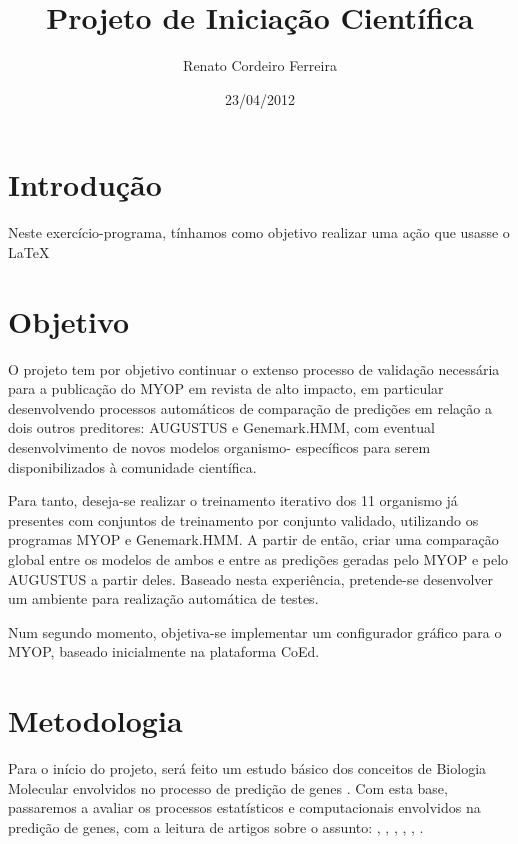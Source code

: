 \documentclass[a4paper,12pt]{article}
\title{Projeto de Iniciação Científica}
\author{Renato Cordeiro Ferreira}
\date{23/04/2012}
\begin{document}
\newpage %

\section{Introdução} %

    Neste exercício-programa, tínhamos como objetivo realizar uma ação
    que usasse o \LaTeX

\section{Objetivo} %

  O projeto tem por objetivo continuar o extenso processo de validação necessária
  para a publicação do MYOP em revista de alto impacto, em particular desenvolvendo
  processos automáticos de comparação de predições em relação a dois outros preditores:
  AUGUSTUS e Genemark.HMM, com eventual desenvolvimento de novos modelos organismo-
  específicos para serem disponibilizados à comunidade científica.
  
  Para tanto, deseja-se realizar o treinamento iterativo dos 11 organismo já presentes
  com conjuntos de treinamento por conjunto validado, utilizando os programas MYOP e
  Genemark.HMM. A partir de então, criar uma comparação global entre os modelos de ambos
  e entre as predições geradas pelo MYOP e pelo AUGUSTUS a partir deles. Baseado nesta
  experiência, pretende-se desenvolver um ambiente para realização automática de testes.
  
  Num segundo momento, objetiva-se implementar um configurador gráfico para o MYOP, 
  baseado inicialmente na plataforma CoEd. %
  
\section{Metodologia} %
  
  Para o início do projeto, será feito um estudo básico dos conceitos de Biologia 
  Molecular envolvidos no processo de predição de genes \citep{TheCell2002}. 
  Com esta base, passaremos a avaliar os processos estatísticos e computacionais
  envolvidos na predição de genes, com a leitura de artigos sobre o assunto: \citet{Costa2003}, 
  \citet{Snyder1995}, \citet{Zhang2002}, \citet{Korf2004}, \citet{Mathe2002}, 
  \citet{Wang2004}.
  
\end{document}
